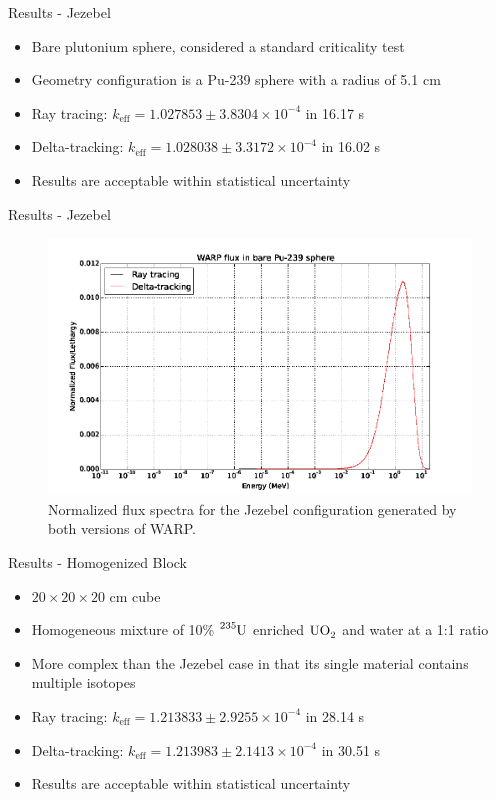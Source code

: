 \documentclass[xcolor=x11names, compress, handout]{beamer}
\renewcommand{\(}{\begin{columns}}
\renewcommand{\)}{\end{columns}}
\newcommand{\<}[1]{\begin{column}{#1}}
\renewcommand{\>}{\end{column}}
\begin{document}
\begin{frame}{Results - Jezebel}
	\begin{itemize}
	\item{Bare plutonium sphere, considered a standard criticality test \cite{nea1995}}
	\pause
	\item{Geometry configuration is a Pu-239 sphere with a radius of 5.1 cm}
	\pause
	\item{Ray tracing: $k_{\mathrm{eff}} = 1.027853 \pm 3.8304 \times 10^{-4}$ in 16.17 s}
	\pause
	\item{Delta-tracking: $k_{\mathrm{eff}} = 1.028038 \pm 3.3172 \times 10^{-4}$ in 16.02 s}
	\pause
	\item{Results are acceptable within statistical uncertainty}
	\end{itemize}
\end{frame}


\begin{frame}{Results - Jezebel}
	\begin{figure}[h!]
	\includegraphics[width=0.9\linewidth]{../figs/godiva}
	\caption*{Normalized flux spectra for the Jezebel configuration generated by both versions of WARP.
	\label{godiva}}
	\end{figure}
\end{frame}


\begin{frame}{Results - Homogenized Block}
	\begin{itemize}
	\item{$20\times20\times20$ cm cube}
	\pause
	\item{Homogeneous mixture of 10\% $\ce{^{235}U}$ enriched $\ce{UO_2}$ and water at a 1:1 ratio}
	\pause
	\item{More complex than the Jezebel case in that its single material contains multiple isotopes}
	\pause
	\item{Ray tracing: $k_{\mathrm{eff}} = 1.213833 \pm 2.9255 \times 10^{-4}$ in 28.14 s}
	\pause
	\item{Delta-tracking: $k_{\mathrm{eff}} = 1.213983 \pm 2.1413 \times 10^{-4}$ in 30.51 s}
	\pause
	\item{Results are acceptable within statistical uncertainty}
	\end{itemize}
\end{frame}
\end{document}

